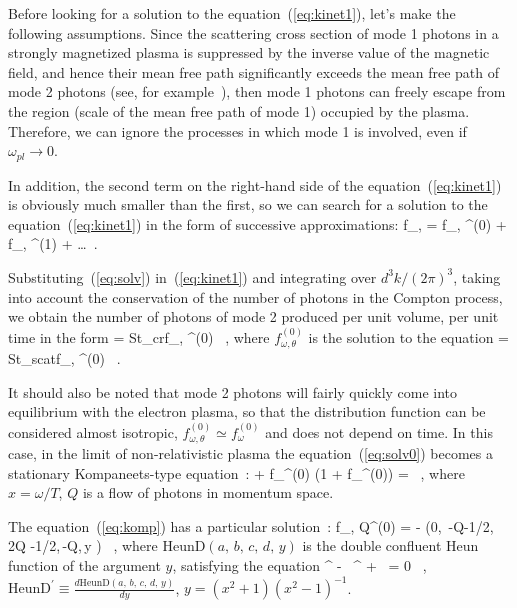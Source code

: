 \documentclass[
aps,%
12pt,%
final,%
notitlepage,%
oneside,%
onecolumn,%
nobibnotes,%
nofootinbib,%
superscriptaddress,%
noshowpacs,%
centertags]%
{revtex4}
\begin{document}
Before looking for a solution to the equation~(\ref{eq:kinet1}), let's make the following assumptions.
Since the scattering cross section of mode 1 photons in a strongly magnetized plasma is suppressed by 
the  inverse value of the magnetic field, and hence their mean free path significantly exceeds the mean 
free path of mode 2 photons (see, for example~\cite{RChSt:2012,RCh09}), then mode 1 photons can 
freely escape from the region 
(scale of the mean free path of mode 1) occupied by the plasma. Therefore, we can ignore the processes in which mode 1 
is involved, even if $\omega_{pl} \to 0$.

In addition, the second term on the right-hand side of the 
equation~(\ref{eq:kinet1}) is obviously much smaller than the first, so we 
can search for a solution to the equation~(\ref{eq:kinet1}) in the form of successive approximations:
%
\beq
\label{eq:solv}
f_{\omega, \theta} = f_{\omega, \theta}^{(0)} + f_{\omega, \theta}^{(1)} + \ldots \, .
\eeq

Substituting~(\ref{eq:solv}) in~(\ref{eq:kinet1})  and integrating over $d^3k/(2\pi)^3$, 
taking into account the conservation of the number of photons in 
the Compton process, we obtain the number of photons of mode 2 produced per unit volume, per unit time 
in the form
%
\beq
\label{eq:photnumb}
 = \int {} St_{cr}f_{\omega, \theta}^{(0)} \, , 
\eeq
\noindent where $f_{\omega, \theta}^{(0)}$ is the solution to the equation
%
\beq
\label{eq:solv0}
 = St_{scat}f_{\omega, \theta}^{(0)} \, . 
\eeq



It should also be noted that mode 2 photons will fairly quickly come into equilibrium with the electron plasma, 
so that the distribution function can be considered almost isotropic, 
$f_{\omega, \theta}^{(0)} \simeq f_{\omega}^{(0)}$ and does not depend on time. In this case, in the limit 
of non-relativistic plasma the equation~(\ref{eq:solv0}) becomes a stationary 
Kompaneets-type equation~\cite{Kompaneets1957}:
%
\beq
\label{eq:komp}
  + f_{\omega}^{(0)} (1 + f_{\omega}^{(0)}) =  \, ,
\eeq
\noindent where $x=\omega/T$, $Q$ is a flow of photons in momentum space.

The equation~(\ref{eq:komp}) has a particular solution~\cite{Dub2009}:
%
\beq
\label{eq:statsolv}
f_{\omega, Q}^{(0)} =  -  
{\left(0,\, -Q-1/2, \, 2Q -1/2,\,-Q,\,y \right)} \, ,
\eeq
\noindent where $\mathrm{HeunD}\left(a,\, b, \, c,\,d,\,y \right)$ is the double confluent Heun 
function of the argument $y$, satisfying the equation
\beq
\label{eq:heuneq}
^{\prime \prime} -  \, ^{\prime} + 
 \,    = 0 \, ,
\eeq
\noindent $\mathrm{HeunD}^{\prime} \equiv \frac{d\mathrm{HeunD}\left(a,\, b, \, c,\,d,\,y \right)}{dy}$, 
$y=(x^2+1) (x^2-1)^{-1}$.
\end{document}
